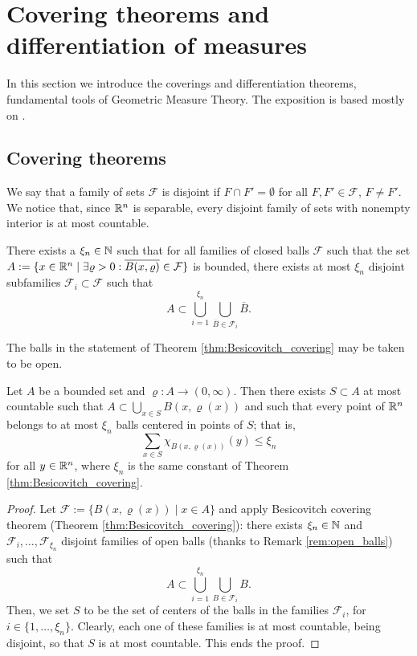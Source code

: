 \section{Covering theorems and differentiation of measures}

In this section we introduce the coverings and differentiation theorems, fundamental tools of Geometric Measure Theory. The exposition is based mostly on \cite[Chapter 2]{AFP}.

\subsection{Covering theorems}
We say that a family of sets $\mathcal{F}$ is disjoint if $F \cap F' = \emptyset$ for
all $F,F' \in \mathcal{F}$, $F \neq F'$.
We notice that, since $\mathbb{R}^{n}$ is separable, every disjoint family of sets with nonempty interior is at most countable.

\begin{theorem} \label{thm:Besicovitch_covering}
There exists a $\xi_n \in \mathbb{N}$ such that for all families of closed balls
$\mathcal{F}$ such that the set 
$A: = \{ x \in \mathbb{R}^n \mid \exists \varrho > 0 : \overline{B(x,\varrho)} \in
\mathcal{F}\}$ is bounded, there exists at most $\xi_n$ disjoint subfamilies
$\mathcal{F}_i \subset \mathcal{F}$ such that 
\[
A \subset \bigcup_{i=1}^{\xi_n} \bigcup_{\overline{B} \in \mathcal{F}_i}
\overline{B}.
\]
\end{theorem}

\begin{remark} \label{rem:open_balls}
The balls in the statement of Theorem \ref{thm:Besicovitch_covering} may be taken to be open.
\end{remark}

\begin{theorem} \label{thm:Besicovitch_covering_1}
Let $A$ be a bounded set and $\varrho : A \to (0,\infty)$. Then there exists $S
\subset A$ at most countable such that 
\(
A \subset \bigcup_{x\in S} B(x,\varrho(x)) 
\)
and such that every point of $\mathbb{R}^{n}$ belongs to at most $\xi_{n}$ balls centered in points of $S$; that is,
\[
\sum_{x \in S} \chi_{B(x,\varrho(x))}(y) \leq \xi_n
\]
for all $y \in \mathbb{R}^n$, where $\xi_{n}$ is the same constant of Theorem \ref{thm:Besicovitch_covering}.
\end{theorem}
\begin{proof}
Let $\mathcal{F} := \{B(x,\varrho(x)) \mid x \in A\}$ and apply Besicovitch covering theorem (Theorem \ref{thm:Besicovitch_covering}): there exists $\xi_{n} \in \mathbb{N}$ and $\mathcal{F}_{i}, \dots, \mathcal{F}_{\xi_{n}}$ disjoint families of open balls (thanks to Remark \ref{rem:open_balls}) such that
\begin{equation*}
A \subset \bigcup_{i = 1}^{\xi_{n}} \bigcup_{B \in \mathcal{F}_{i}} B.
\end{equation*} 
Then, we set $S$ to be the set of centers of the balls in the families $\mathcal{F}_{i}$, for $i \in \{1, \dots, \xi_{n}\}$. Clearly, each one of these families is at most countable, being disjoint, so that $S$ is at most countable. This ends the proof.
\end{proof}

